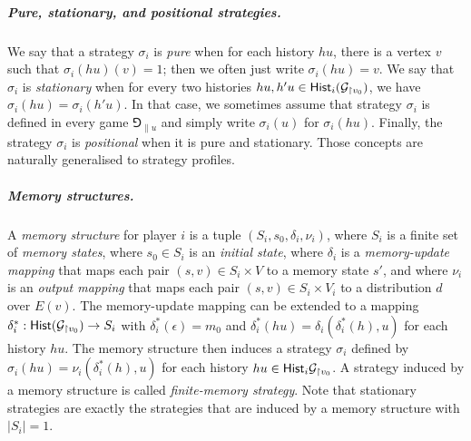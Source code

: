     
\subparagraph{Pure, stationary, and positional strategies.}
We say that a strategy $\sigma_i$ is \emph{pure} when for each history $hu$, there is a vertex $v$ such that $\sigma_i(hu)(v) = 1$; then we often just write $\sigma_i(hu) = v$. 
We say that $\sigma_i$ is \emph{stationary} when for every two histories $hu, h'u \in \mathsf{Hist}_i(\mathcal{G}_{\upharpoonright v_0})$, we have $\sigma_i(hu) = \sigma_i(h'u)$.
In that case, we sometimes assume that strategy $\sigma_i$ is defined in every game $\Game_{\|u}$ and simply write $\sigma_i(u)$ for $\sigma_i(hu)$.
Finally, the strategy $\sigma_i$ is \emph{positional} when it is pure and stationary.
Those concepts are naturally generalised to strategy profiles.

\subparagraph*{Memory structures.}
A \emph{memory structure} for player $i$ is a tuple $(S_i, s_0, \delta_i, \nu_i)$, where $S_i$ is a finite set of \emph{memory states}, where $s_0 \in S_i$ is an \emph{initial state}, where $\delta_i$ is a \emph{memory-update mapping} that maps each pair $(s, v) \in S_i \times V$ to a memory state $s'$, and where $\nu_i$ is an \emph{output mapping} that maps each pair $(s, v) \in S_i \times V_i$ to a distribution $d$ over $E(v)$.
The memory-update mapping can be extended to a mapping $\delta_i^*: \mathsf{Hist}(\mathcal{G}_{\upharpoonright v_0}) \to S_i$ with $\delta_i^*(\epsilon) = m_0$ and $\delta_i^*(hu) = \delta_i(\delta_i^*(h), u)$ for each history $hu$.
The memory structure then induces a strategy $\sigma_i$ defined by $\sigma_i(hu) = \nu_i(\delta^*_i(h), u)$ for each history $hu \in \mathsf{Hist}_i\mathcal{G}_{\upharpoonright v_0}$.
A strategy induced by a memory structure is called \emph{finite-memory strategy}.
Note that stationary strategies are exactly the strategies that are induced by a memory structure with $|S_i| = 1$.


